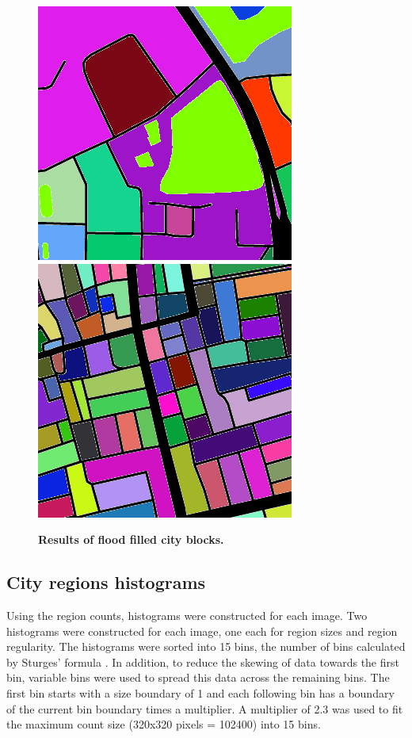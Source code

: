 \documentclass[final,3p,times,authoryear]{elsarticle}
\begin{document}
\begin{figure}[!htbp]
    \centering    
\includegraphics[scale=0.3]{Images/city82-745994-result.png}  
\includegraphics[scale=0.3]{Images/city1667-82612-result.png}
\caption{\bf Results of flood filled city blocks.}    
 \label{fig:floodfilled}  
\end{figure} 

\subsection{City regions histograms}\label{methodshist}

Using the region counts, histograms were constructed for each image. Two histograms were constructed for each image, one each for region sizes and region regularity. The histograms were sorted into 15 bins, the number of bins calculated by Sturges' formula \citep{Sturges1926}. In addition, to reduce the skewing of data towards the first bin, variable bins were used to spread this data across the remaining bins. The first bin starts with a size boundary of 1 and each following bin has a boundary of the current bin boundary times a multiplier. A multiplier of 2.3 was used to fit the maximum count size (320x320 pixels = 102400) into 15 bins.
\end{document}
